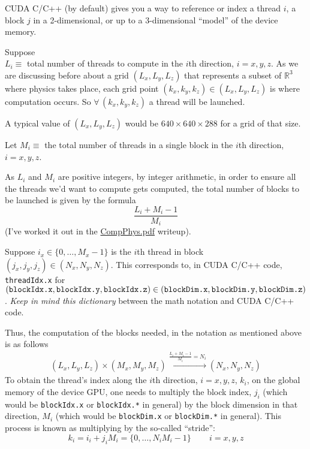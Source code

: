 \documentclass[10pt, landscape]{amsart}
\begin{document}
CUDA C/C++ (by default) gives you a way to reference or index a thread $i$, a block $j$ in a 2-dimensional, or up to a 3-dimensional ``model'' of the device memory.

Suppose \\
$L_i \equiv $ total number of threads to compute in the $i$th direction, $i=x,y,z$.  As we are discussing before about a grid $(L_x,L_y,L_z)$ that represents a subset of $\mathbb{R}^3$ where physics takes place, each grid point $(k_x,k_y,k_z) \in (L_x,L_y,L_z)$ is where computation occurs.  So $\forall \, (k_x,k_y,k_z)$ a thread will be launched.

A typical value of $(L_x,L_y,L_z)$ would be $640\times 640 \times 288$ for a grid of that size.

Let $M_i \equiv $ the total number of threads in a single block in the $i$th direction, $i=x,y,z$.

As $L_i$ and $M_i$ are positive integers, by integer arithmetic, in order to ensure all the threads we'd want to compute gets computed, the total number of blocks to be launched is given by the formula
\[
\frac{ L_i + M_i - 1}{ M_i}
\]
(I've worked it out in the \href{https://github.com/ernestyalumni/CompPhys/blob/master/LaTeXandpdfs/CompPhys.pdf}{CompPhys.pdf} writeup).

Suppose $i_x \in \lbrace 0 , \dots , M_x - 1\rbrace$ is the $i$th thread in block $(j_x,j_y,j_z) \in (N_x,N_y,N_z)$.  This corresponds to, in CUDA C/C++ code, \verb|threadIdx.x| for $(\verb|blockIdx.x|, \verb|blockIdx.y|, \verb|blockIdx.z| ) \in ( \verb|blockDim.x|, \verb|blockDim.y|, \verb|blockDim.z|)$.  \emph{Keep in mind this dictionary} between the math notation and CUDA C/C++ code.

Thus, the computation of the blocks needed, in the notation as mentioned above is as follows
\[
\begin{gathered}
  (L_x, L_y,L_z) \times (M_x,M_y,M_z) \xrightarrow{ \frac{ L_i + M_i - 1}{ M_i} = N_i } (N_x,N_y,N_z)
  \end{gathered}
\]
To obtain the thread's index along the $i$th direction, $i=x,y,z$, $k_i$, on the global memory of the device GPU, one needs to multiply the block index, $j_i$ (which would be \verb|blockIdx.x| or \verb|blockIdx.*| in general) by the block dimension in that direction, $M_i$ (which would be \verb|blockDim.x| or \verb|blockDim.*| in general).  This process is known as multiplying by the so-called ``stride'':
\[
k_i = i_i + j_i M_i = \lbrace 0 , \dots , N_i M_i - 1 \rbrace \qquad \, i = x,y,z
\]
\end{document}
